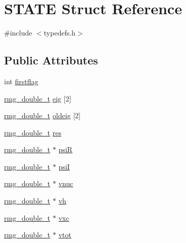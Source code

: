 \hypertarget{struct_s_t_a_t_e}{\section{S\-T\-A\-T\-E Struct Reference}
\label{struct_s_t_a_t_e}
}


{\ttfamily \#include $<$typedefs.\-h$>$}

\subsection*{Public Attributes}
\begin{DoxyCompactItemize}
\item 
int \hyperlink{struct_s_t_a_t_e_abbd327a27b5199d890feacb6c5753360}{firstflag}
\item 
\hyperlink{rmgtypes_8h_aaa16921c14f121c56eaa42390a340db8}{rmg\-\_\-double\-\_\-t} \hyperlink{struct_s_t_a_t_e_ad0c244fac6ef4c7d1e5b5502e6b1335c}{eig} \mbox{[}2\mbox{]}
\item 
\hyperlink{rmgtypes_8h_aaa16921c14f121c56eaa42390a340db8}{rmg\-\_\-double\-\_\-t} \hyperlink{struct_s_t_a_t_e_a36e9f9a7dc0c241ea52d6fce40d807f1}{oldeig} \mbox{[}2\mbox{]}
\item 
\hyperlink{rmgtypes_8h_aaa16921c14f121c56eaa42390a340db8}{rmg\-\_\-double\-\_\-t} \hyperlink{struct_s_t_a_t_e_a604d7f132167997ff522685cef18ffbf}{res}
\item 
\hyperlink{rmgtypes_8h_aaa16921c14f121c56eaa42390a340db8}{rmg\-\_\-double\-\_\-t} $\ast$ \hyperlink{struct_s_t_a_t_e_a58b00a9a0c47eea5abf002ec2897b925}{psi\-R}
\item 
\hyperlink{rmgtypes_8h_aaa16921c14f121c56eaa42390a340db8}{rmg\-\_\-double\-\_\-t} $\ast$ \hyperlink{struct_s_t_a_t_e_a5e492bb5240028ad91cfa98e16a37da2}{psi\-I}
\item 
\hyperlink{rmgtypes_8h_aaa16921c14f121c56eaa42390a340db8}{rmg\-\_\-double\-\_\-t} $\ast$ \hyperlink{struct_s_t_a_t_e_ad81fa098da86bd6516314ca864d8b47d}{vnuc}
\item 
\hyperlink{rmgtypes_8h_aaa16921c14f121c56eaa42390a340db8}{rmg\-\_\-double\-\_\-t} $\ast$ \hyperlink{struct_s_t_a_t_e_a60616558e0178cbb95a8db97a5abd95b}{vh}
\item 
\hyperlink{rmgtypes_8h_aaa16921c14f121c56eaa42390a340db8}{rmg\-\_\-double\-\_\-t} $\ast$ \hyperlink{struct_s_t_a_t_e_abeecdcf66c17aba722096c62c564b049}{vxc}
\item 
\hyperlink{rmgtypes_8h_aaa16921c14f121c56eaa42390a340db8}{rmg\-\_\-double\-\_\-t} $\ast$ \hyperlink{struct_s_t_a_t_e_a3fa6cf25f00320eed1391a2c043d9c3e}{vtot}

\end{DoxyCompactItemize}
